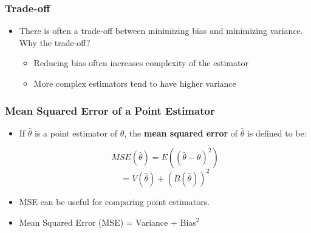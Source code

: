 \documentclass[12pt]{beamer}
\begin{document}
\begin{frame}
\frametitle{Trade-off}

\begin{itemize}[label={\color{blue}$\blacktriangleright$}]
\item There is often a trade-off between minimizing bias and minimizing variance. Why the trade-off?
\begin{itemize}[label={\color{blue}$\blacktriangleright$}]
	\item Reducing bias often increases complexity of the estimator
	\item More complex estimators tend to have higher variance
\end{itemize}
	\end{itemize}

\end{frame}
\begin{frame}
	\frametitle{Mean Squared Error of a Point Estimator}
	
	\begin{itemize}[label={\color{blue}$\blacktriangleright$}]
		
		\item If $\hat{\theta}$ is a point estimator of $\theta$, the \textbf{mean squared error} of $\hat{\theta}$ is defined to be:
		
		\[
		MSE(\hat{\theta}) = E\left(\left(\hat{\theta} - \theta\right)^2\right)
		\]
		\[
		= V(\hat{\theta}) + \left(B(\hat{\theta})\right)^2
		\]
		
		\item MSE can be useful for comparing point estimators.
		\item Mean Squared Error (MSE) = Variance + Bias$^2$
	\end{itemize}
	
\end{frame}
\end{document}
